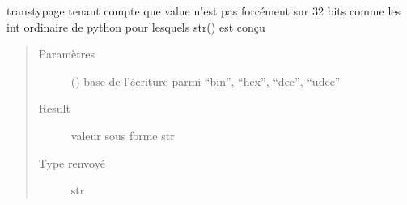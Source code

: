 \documentclass[letterpaper,10pt,french]{sphinxmanual}
\begin{document}
\begin{fulllineitems}
\begin{fulllineitems}
\label{\detokenize{executeurcomponents:executeurcomponents.DataValue.toStr}}
transtypage tenant compte que value n’est pas forcément sur 32 bits
comme les int ordinaire de python pour lesquels str() est conçu
\begin{quote}\begin{description}
\item[{Paramètres}] \leavevmode
{} () \textendash{} base de l’écriture parmi “bin”, “hex”, “dec”, “udec”

\item[{Result}] \leavevmode
valeur sous forme str

\item[{Type renvoyé}] \leavevmode
str

\end{description}\end{quote}

\end{fulllineitems}


\end{fulllineitems}

\end{document}

